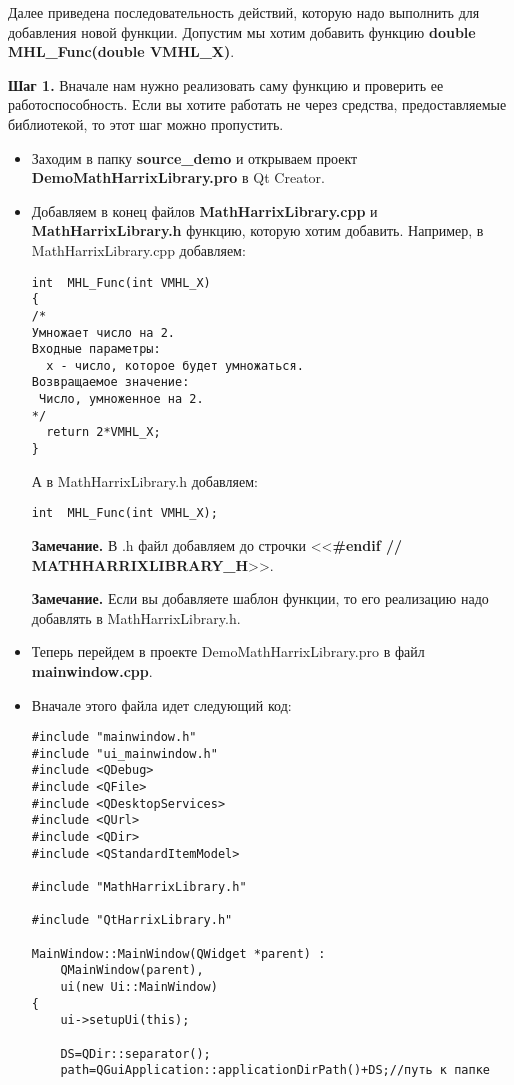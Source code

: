 Далее приведена последовательность действий, которую надо выполнить для добавления новой функции. Допустим мы хотим добавить функцию  \textbf{double MHL\_Func(double VMHL\_X)}.

\textbf{Шаг 1.}\label{step1} Вначале нам нужно реализовать саму функцию и проверить ее работоспособность. Если вы хотите работать не через средства, предоставляемые библиотекой, то этот шаг можно пропустить.

\begin{itemize}
\item Заходим в папку \textbf{source\_demo} и открываем проект \textbf{DemoMathHarrixLibrary.pro} в Qt Creator.
\item Добавляем в конец файлов \textbf{MathHarrixLibrary.cpp} и \textbf{MathHarrixLibrary.h} функцию, которую хотим добавить. Например, в MathHarrixLibrary.cpp добавляем:
\begin{lstlisting}[label=examplefunction01, caption=Что добавляем в MathHarrixLibrary.cpp]
int  MHL_Func(int VMHL_X)
{
/*
Умножает число на 2.
Входные параметры:
  x - число, которое будет умножаться.
Возвращаемое значение:
 Число, умноженное на 2.
*/
  return 2*VMHL_X;
}
\end{lstlisting}
А в MathHarrixLibrary.h добавляем:
\begin{lstlisting}[label=examplefunction02, caption=Что добавляем в MathHarrixLibrary.h]
int  MHL_Func(int VMHL_X);
\end{lstlisting}
\textbf{Замечание.} В .h файл добавляем до строчки <<\textbf{\#endif // MATHHARRIXLIBRARY\_H}>>.

\textbf{Замечание.} Если вы добавляете шаблон функции, то его реализацию надо добавлять в MathHarrixLibrary.h.
\item Теперь перейдем в проекте DemoMathHarrixLibrary.pro в файл \textbf{mainwindow.cpp}.
\item Вначале этого файла идет следующий код:
\begin{lstlisting}[label=examplefunction03, caption=mainwindow.cpp]
#include "mainwindow.h"
#include "ui_mainwindow.h"
#include <QDebug>
#include <QFile>
#include <QDesktopServices>
#include <QUrl>
#include <QDir>
#include <QStandardItemModel>

#include "MathHarrixLibrary.h"

#include "QtHarrixLibrary.h"

MainWindow::MainWindow(QWidget *parent) :
    QMainWindow(parent),
    ui(new Ui::MainWindow)
{
    ui->setupUi(this);

    DS=QDir::separator();
    path=QGuiApplication::applicationDirPath()+DS;//путь к папке


\end{lstlisting}
\end{itemize}
